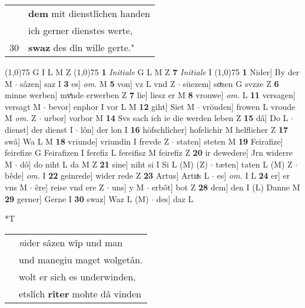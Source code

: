 \documentclass[8pt,a4paper,notitlepage]{article}
\begin{document}
\begin{table}[ht]
\begin{minipage}[t]{0.5\linewidth}
\begin{tabular}{rl}
 & \textbf{dem} mit dienstlîchen handen\\ 
 & ich gerner dienstes werte,\\ 
30 & \textbf{swaz} des dîn wille gerte."\\ 
\end{tabular}
\scriptsize
\line(1,0){75} \newline
G I L M Z \newline
\line(1,0){75} \newline
\textbf{1} \textit{Initiale} G L M Z  \textbf{7} \textit{Initiale} I  \newline
\line(1,0){75} \newline
\textbf{1} Nider] By der M  $\cdot$ sâzen] saz I \textbf{3} es] \textit{om.} M \textbf{5} von] vz L vnd Z  $\cdot$ süezem] soͮzen G svzze Z \textbf{6} minne werben] mvͤnde erwerben Z \textbf{7} lie] liesz er M \textbf{8} vrouwe] \textit{om.} L \textbf{11} versagen] versagt M  $\cdot$ bevor] enphor I vor L M \textbf{12} giht] Siet M  $\cdot$ vröuden] frowen L vroude M \textit{om.} Z  $\cdot$ urbor] vorbor M \textbf{14} Svs sach ich ie die werden leben Z \textbf{15} dâ] Do L  $\cdot$ dienst] der dienst I  $\cdot$ lôn] der lon I \textbf{16} höfschlîcher] hofelichir M helflicher Z \textbf{17} swâ] Wa L M \textbf{18} vriunde] vriundin I frevde Z  $\cdot$ staten] steten M \textbf{19} Feirafize] feirefize G Feirafizen I ferefiz L fereifisz M feirefiz Z \textbf{20} ir dewedere] Jrn widerre M  $\cdot$ dô] do niht L da M Z \textbf{21} sine] niht si I Si L (M) (Z)  $\cdot$ tæten] taten L (M) Z  $\cdot$ bêde] \textit{om.} I \textbf{22} geinrede] wider rede Z \textbf{23} Artus] Artuͯs L  $\cdot$ es] \textit{om.} I L \textbf{24} er] er vns M  $\cdot$ êre] reise vnd ere Z  $\cdot$ uns] y M  $\cdot$ erbôt] bot Z \textbf{28} dem] den I (L) Danne M \textbf{29} gerner] Gerne I \textbf{30} swaz] Waz L (M)  $\cdot$ des] daz L \newline
\end{minipage}
\hspace{0.5cm}
\begin{minipage}[t]{0.5\linewidth}
\small
\begin{center}*T
\end{center}
\begin{tabular}{rl}
 & \textit{n}ider sâzen wîp und man\\ 
 & und manegiu maget wolgetân.\\ 
 & wolt er sich es underwinden,\\ 
 & etslîch \textbf{rîter} mohte dâ vinden\\ 

\end{tabular}
\end{minipage}
\end{table}
\end{document}
